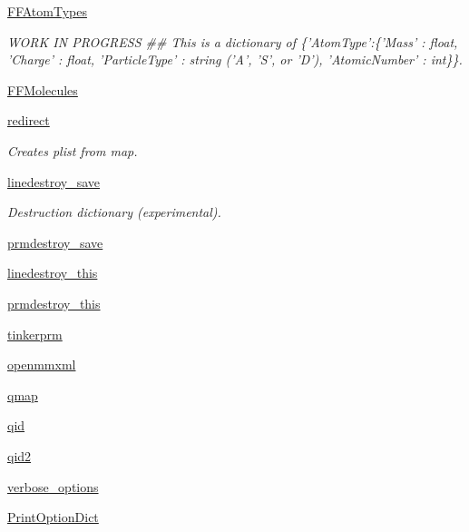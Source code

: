 \begin{DoxyCompactItemize}
\hyperlink{classforcebalance_1_1forcefield_1_1FF_a38e238188fdd105477cd3ad38ca3753b}{F\-F\-Atom\-Types}
\begin{DoxyCompactList}\small\item\em W\-O\-R\-K I\-N P\-R\-O\-G\-R\-E\-S\-S \#\# This is a dictionary of \{'Atom\-Type'\-:\{'Mass' \-: float, 'Charge' \-: float, 'Particle\-Type' \-: string ('A', 'S', or 'D'), 'Atomic\-Number' \-: int\}\}. \end{DoxyCompactList}\item 
\hyperlink{classforcebalance_1_1forcefield_1_1FF_aa5ba15f51599b631b9be90cda847f1d9}{F\-F\-Molecules}
\item 
\hyperlink{classforcebalance_1_1forcefield_1_1FF_ada9b82220eb6e6335a36617dd5746695}{redirect}
\begin{DoxyCompactList}\small\item\em Creates plist from map. \end{DoxyCompactList}\item 
\hyperlink{classforcebalance_1_1forcefield_1_1FF_aa4f1adc1fc16e922c98145553ac5b67f}{linedestroy\-\_\-save}
\begin{DoxyCompactList}\small\item\em Destruction dictionary (experimental). \end{DoxyCompactList}\item 
\hyperlink{classforcebalance_1_1forcefield_1_1FF_aa8442ee77e526c7a55401a84191274fd}{prmdestroy\-\_\-save}
\item 
\hyperlink{classforcebalance_1_1forcefield_1_1FF_ab2ca57079cb49527775d044a2b2db6db}{linedestroy\-\_\-this}
\item 
\hyperlink{classforcebalance_1_1forcefield_1_1FF_aed70f4b01bc5d2c27ee5d174c5f1d83f}{prmdestroy\-\_\-this}
\item 
\hyperlink{classforcebalance_1_1forcefield_1_1FF_a62aa95ac960282ccae808ba05e3ecda1}{tinkerprm}
\item 
\hyperlink{classforcebalance_1_1forcefield_1_1FF_aed4d7b3f12f4264b8a5afd70cffe80dc}{openmmxml}
\item 
\hyperlink{classforcebalance_1_1forcefield_1_1FF_a20352a24f2babfbf1ca4dd3d51f1483b}{qmap}
\item 
\hyperlink{classforcebalance_1_1forcefield_1_1FF_aef61d1ce1a5e9f46b9c1c779dc7c8ebe}{qid}
\item 
\hyperlink{classforcebalance_1_1forcefield_1_1FF_abe794c7ed53eb15547b29e04917153a9}{qid2}
\item 
\hyperlink{classforcebalance_1_1BaseClass_afd68efa29ccd2f320f4cf82198214aac}{verbose\-\_\-options}
\item 
\hyperlink{classforcebalance_1_1BaseClass_afc6659278497d7245bc492ecf405ccae}{Print\-Option\-Dict}
\end{DoxyCompactItemize}


